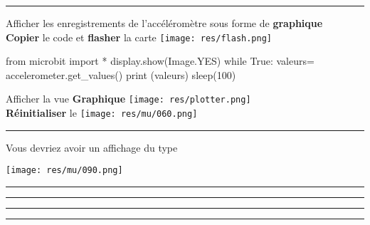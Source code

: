 \begin{minipage}[t]{0.5\linewidth}
\begin{methode}[Graphique]\rule{-0.25em}{1.6em}
	Afficher les enregistrements de l'accéléromètre sous forme de \textbf{graphique}
	\\[1em]


		\textbf{Copier} le code et 	
		\textbf{flasher} la carte 
		\hfill\texttt{[image: res/flash.png]}

		\begin{mucode}
from microbit import *
display.show(Image.YES)
while True:
	valeurs= accelerometer.get_values()
	print (valeurs)
	sleep(100)
		\end{mucode}
				
		Afficher la vue \textbf{Graphique}
		\hfill\texttt{[image: res/plotter.png]}\\
		\textbf{Réinitialiser} le \mb
		\hfill\texttt{[image: res/mu/060.png]}



\end{methode}
\end{minipage}
%
%
\begin{minipage}[t]{0.5\linewidth}
\begin{remarque}\rule{-0.25em}{1.6em}
	Vous devriez avoir un affichage du type\\
	
	\begin{center}
		
		\texttt{[image: res/mu/090.png]}	
	\end{center}
	
\end{remarque}
\end{minipage}


\begin{minipage}[t]{0.5\linewidth}
	\begin{methode}\rule{-0.25em}{1.6em}

	\rule{5em}{30em}

	\end{methode}
\end{minipage}
%
%
\begin{minipage}[t]{0.5\linewidth}
	\begin{methode}\rule{-0.25em}{1.6em}

	\rule{5em}{40em}

	\end{methode}
\end{minipage}
%
%
	
	
